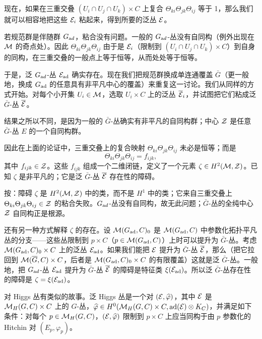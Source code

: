 现在，如果在三重交叠 $(U_i\cap U_j\cap U_k)\times C$ 上复合 $\Theta_{ki}\Theta_{jk}\Theta_{ij}$ 等于 1，那么我们就可以相容地把这些 ${\EUE}_i$ 粘起来，得到所要的泛丛 ${\EUE}$。

若规范群是伴随群 $G_{{\rm ad}}$，粘合没有问题。一般的 $G_{{\rm ad}}$-丛没有自同构（例外出现在 $\M$ 的奇点处）。因此 $\Theta_{ki}\Theta_{jk}\Theta_{ij}$ 由于是 ${\EUE}_i$（限制到 $(U_i\cap U_j\cap U_k)\times C$）到自身的同构，在三重交叠的一般点上等于恒等，从而处处等于恒等。

于是，泛 $G_{{\rm ad}}$-丛 ${\EUE}_{\rm {ad}}$ 确实存在。现在我们把规范群换成单连通覆盖 $\bar G$（更一般地，换成 $G_{\rm{ad}}$ 的任意具有非平凡中心的覆盖）来重复这一讨论。我们从同样的方式开始。对每个小开集 $U_i\in \M$，选取 $U_i\times C$ 上的泛丛 $\bar {\EUE}_i$，并试图把它们粘成泛 $\bar G$-丛 $\bar {\EUE}$。

结果之所以不同，是因为一般的 $\bar G$-丛确实有非平凡的自同构群；中心 $\CZ$ 是任意 $\bar G$-丛 $E$ 的一个自同构群。

因此在上面的论证中，三重交叠上的复合映射 $\Theta_{ki}\Theta_{jk}\Theta_{ij}$ 未必是恒等；而是 %
\setcounter{equation}{11}
\begin{equation}\label{eq:yrf}
\Theta_{ki}\Theta_{jk}\Theta_{ij}=f_{ijk},
\end{equation}
其中 $f_{ijk}\in\CZ$。这些 $f_{ijk}$ 组成一个二维闭链，定义了一个元素 $\zeta\in H^2(\M,\CZ)$。已知 $\zeta$ 是非平凡的；它是泛 $\bar G$-丛 $\bar{\EUE}$ 存在性的障碍。

\begin{yizhu}[易错点]
按：障碍 $\zeta$ 是 $H^2(\M,\CZ)$ 中的类，而不是 $H^1$ 中的类；它来自三重交叠上 $\Theta_{ki}\Theta_{jk}\Theta_{ij}\in\CZ$ 的粘合失败。$G_{\rm ad}$-丛没有自同构，故无此问题；$\bar G$-丛的全纯中心 $\CZ$ 自同构正是根源。
\end{yizhu}

还有另一种方式解释 $\zeta$ 的存在。设 $\M(G_{\rm{ad}},C)_0$ 是 $\M(G_{\rm{ad}},C)$ 中参数化拓扑平凡丛的分支——这些丛限制到 $p\times C$（$p\in \M(G_{\rm{ad}},C)$）上时可以提升为 $\bar G$-丛。考虑 $\M(G_{\rm{ad}},C)_0\times C$ 上的泛丛 ${\EUE}_{\rm{ad}}$。如果我们能把 ${\EUE}$ 提升为 $\bar G$-丛 $\bar {\EUE}$，那么（把它拉回到 $\M(\bar G,C)\times C$，后者是 $\M(G_{\rm {ad}},C)_0\times C$ 的有限覆盖）这就是泛 $\bar G$-丛。一般地，把 $G_{\rm ad}$-丛 ${\EUE}_{\rm{ad}}$ 提升为 $\bar G$-丛 $\bar {\EUE}$ 的障碍是特征类 $\xi({\EUE}_{\rm{ad}})$。所以泛 $\bar G$-丛存在性的障碍是 $\zeta=\xi({\EUE}_{\rm {ad}})$。

对 Higgs 丛有类似的故事。泛 Higgs 丛是一个对 $( {\EUE},\hat \varphi)$，其中 $ {\EUE} $ 是 $\MH(G,C)\times C$ 上的 $G$-丛，$\hat\varphi\in H^0( \MH(G,C)\times C,{\rm {ad}}({\EUE})\otimes K_C)$，并满足如下条件：对每个 $p\in \MH(G,C)$，$( {\EUE},\hat\varphi)$ 限制到 $p\times C$ 上应当同构于由 $p$ 参数化的 Hitchin 对 $(E_p,\varphi_p)$。

